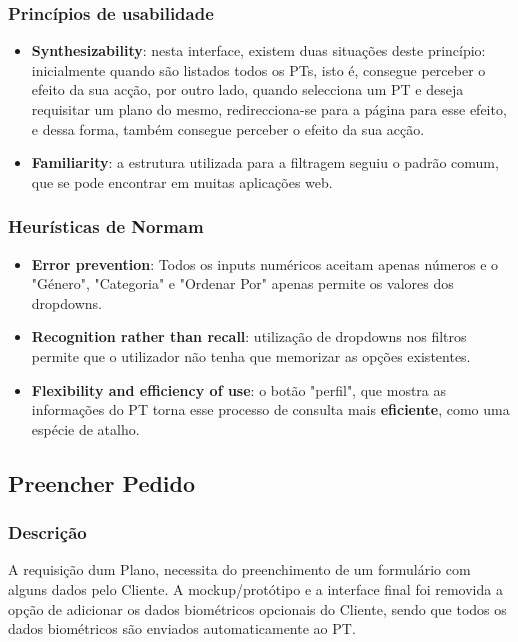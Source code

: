 \subsubsection{Princípios de usabilidade}
\begin{itemize}
    \item \textbf{Synthesizability}: nesta interface, existem duas situações deste princípio: inicialmente quando são listados todos os PTs, isto é, consegue perceber o efeito da sua acção, por outro lado, quando selecciona um PT e deseja requisitar um plano do mesmo, redirecciona-se para a página para esse efeito, e dessa forma, também consegue perceber o efeito da sua acção.
    \item \textbf{Familiarity}: a estrutura utilizada para a filtragem seguiu o padrão comum, que se pode encontrar em muitas aplicações web.
\end{itemize}

\subsubsection{Heurísticas de Normam}
\begin{itemize}
    \item \textbf{Error prevention}: Todos os inputs numéricos aceitam apenas números e o "Género", "Categoria" e "Ordenar Por" apenas permite os valores dos dropdowns.
    \item \textbf{Recognition rather than recall}: utilização de dropdowns nos filtros permite que o utilizador não tenha que memorizar as opções existentes.
    \item \textbf{Flexibility and efficiency of use}: o botão "perfil", que mostra as informações do PT torna esse processo de consulta mais \textbf{eficiente}, como uma espécie de atalho.
\end{itemize}

\subsection{Preencher Pedido}
\label{subsec:preencherpedido}

\subsubsection{Descrição}
\hspace{5mm} A requisição dum Plano, necessita do preenchimento de um formulário com alguns dados pelo Cliente. A mockup/protótipo e a interface final foi removida a opção de adicionar os dados biométricos opcionais do Cliente, sendo que todos os dados biométricos são enviados automaticamente ao PT.

